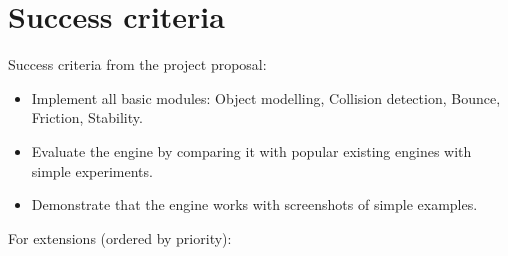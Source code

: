 \documentclass[12pt,a4paper,twoside,openright]{report}
\begin{document}
\section{Success criteria}

Success criteria from the project proposal:

\begin{itemize}

\item Implement all basic modules: Object modelling, Collision detection, Bounce, Friction, Stability.

\item Evaluate the engine by comparing it with popular existing engines with simple experiments.

\item Demonstrate that the engine works with screenshots of simple examples.
\end{itemize}

For extensions (ordered by priority):
\end{document}
